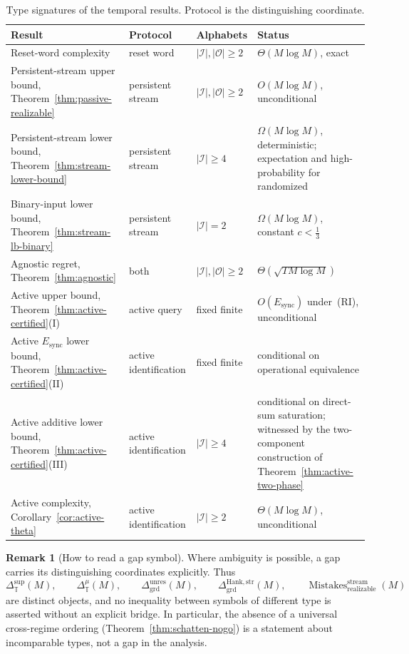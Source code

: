 \documentclass[12pt]{article}
\theoremstyle{definition}
\newtheorem{remark}[theorem]{Remark}
\newcommand{\Dunres}{\Delta_{\mathrm{grd}}^{\mathrm{unres}}}
\newcommand{\DHankstr}{\Delta_{\mathrm{grd}}^{\mathrm{Hank,str}}}
\newcommand{\Esync}{E_{\mathrm{sync}}}
\begin{document}
\begin{table}[htbp]
\centering
\small
\caption{Type signatures of the temporal results.  Protocol is the
distinguishing coordinate.}
\label{tab:type-signatures-temporal}
\begin{tabular}{@{}p{4.2cm}p{3.0cm}p{2.4cm}p{3.4cm}@{}}
\toprule
\textbf{Result} & \textbf{Protocol} & \textbf{Alphabets} &
\textbf{Status} \\
\midrule
Reset-word complexity
& reset word & $|\mathcal I|,|\mathcal O|\ge2$
& $\Theta(M\log M)$, exact \\[2pt]
Persistent-stream upper bound,
Theorem~\ref{thm:passive-realizable}
& persistent stream & $|\mathcal I|,|\mathcal O|\ge2$
& $O(M\log M)$, unconditional \\[2pt]
Persistent-stream lower bound,
Theorem~\ref{thm:stream-lower-bound}
& persistent stream & $|\mathcal I|\ge4$
& $\Omega(M\log M)$, deterministic; expectation and
high-probability for randomized \\[2pt]
Binary-input lower bound,
Theorem~\ref{thm:stream-lb-binary}
& persistent stream & $|\mathcal I|=2$
& $\Omega(M\log M)$, constant $c<\tfrac13$ \\[2pt]
Agnostic regret,
Theorem~\ref{thm:agnostic}
& both & $|\mathcal I|,|\mathcal O|\ge2$
& $\Theta(\sqrt{TM\log M})$ \\[2pt]
Active upper bound,
Theorem~\ref{thm:active-certified}(I)
& active query & fixed finite
& $O(\Esync)$ under~(RI), unconditional \\[2pt]
Active $\Esync$ lower bound,
Theorem~\ref{thm:active-certified}(II)
& active identification & fixed finite
& conditional on operational equivalence \\[2pt]
Active additive lower bound,
Theorem~\ref{thm:active-certified}(III)
& active identification & $|\mathcal I|\ge4$
& conditional on direct-sum saturation; witnessed by the two-component
construction of Theorem~\ref{thm:active-two-phase} \\[2pt]
Active complexity, Corollary~\ref{cor:active-theta}
& active identification & $|\mathcal I|\ge2$
& $\Theta(M\log M)$, unconditional \\
\bottomrule
\end{tabular}
\end{table}

\begin{remark}[How to read a gap symbol]
\label{rem:gap-symbol-convention}
Where ambiguity is possible, a gap carries its distinguishing coordinates
explicitly.  Thus
\[
\Delta_{\mathbb T}^{\sup}(M),
\qquad
\Delta_{\mathbb T}^{\mu}(M),
\qquad
\Dunres(M),
\qquad
\DHankstr(M),
\qquad
\operatorname{Mistakes}^{\text{stream}}_{\mathrm{realizable}}(M)
\]
are distinct objects, and no inequality between symbols of different type is
asserted without an explicit bridge.  In particular, the absence of a
universal cross-regime ordering
(Theorem~\ref{thm:schatten-nogo}) is a statement about incomparable types, not
a gap in the analysis.
\end{remark}
\end{document}
